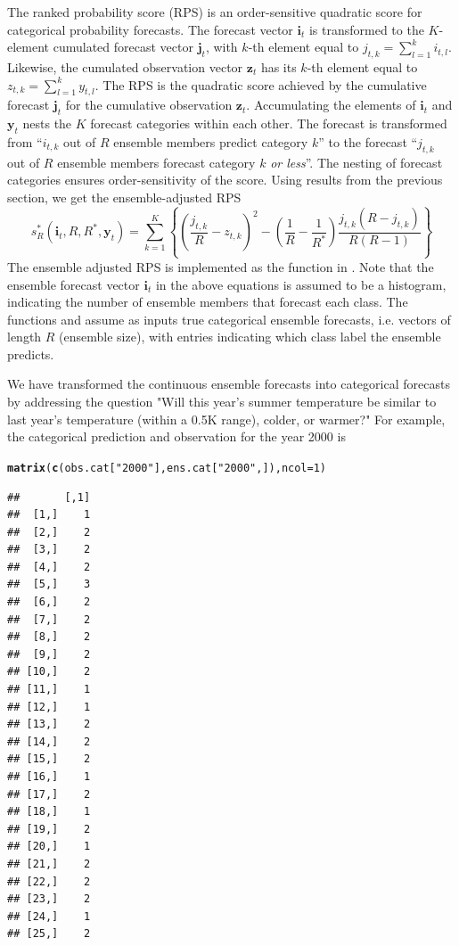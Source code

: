 \documentclass[article]{jss}\usepackage{graphicx, color}
\makeatletter
\newcommand{\hlfunctioncall}[1]{\textcolor[rgb]{0,0.501960784313725,0.752941176470588}{\textbf{#1}}}%
\newcommand{\hlstring}[1]{\textcolor[rgb]{0.650980392156863,0.52156862745098,0}{#1}}%
\newenvironment{kframe}{%
 \def\at@end@of@kframe{}%
 \ifinner\ifhmode%
  \def\at@end@of@kframe{\end{minipage}}%
  \begin{minipage}{\columnwidth}%
 \fi\fi%
 \def\FrameCommand##1{\hskip\@totalleftmargin \hskip-\fboxsep
 \colorbox{shadecolor}{##1}\hskip-\fboxsep
     \hskip-\linewidth \hskip-\@totalleftmargin \hskip\columnwidth}%
 \MakeFramed {\advance\hsize-\width
   \@totalleftmargin\z@ \linewidth\hsize
   \@setminipage}}%
 {\par\unskip\endMakeFramed%
 \at@end@of@kframe}
\newenvironment{knitrout}{}{} %
\makeatother
\begin{document}
The ranked probability score (RPS) is an order-sensitive quadratic score for categorical probability forecasts.
The forecast vector $\mathbf{i}_t$ is transformed to the $K$-element cumulated forecast vector $\mathbf{j}_t$, with $k$-th element equal to $j_{t,k} = \sum_{l=1}^k i_{t,l}$.
Likewise, the cumulated observation vector $\mathbf{z}_t$ has its $k$-th element equal to $z_{t,k} = \sum_{l=1}^k y_{t,l}$.
The RPS is the quadratic score achieved by the cumulative forecast $\mathbf{j}_t$ for the cumulative observation $\mathbf{z}_t$.
Accumulating the elements of $\mathbf{i}_t$ and $\mathbf{y}_t$ nests the $K$ forecast categories within each other. 
The forecast is transformed from ``$i_{t,k}$ out of $R$ ensemble members predict category $k$'' to the forecast ``$j_{t,k}$ out of $R$ ensemble members forecast category $k$ \emph{or less}''.
The nesting of forecast categories ensures order-sensitivity of the score.
Using results from the previous section, we get the ensemble-adjusted RPS
%
\begin{equation}
s_{R}^*(\mathbf{i}_t, R, R^*, \mathbf{y}_t) = \sum_{k=1}^K \left\{ \left(\frac{j_{t,k}}{R} - z_{t,k}\right)^2 - \left(\frac{1}{R} - \frac{1}{R^*}\right) \frac{j_{t,k}(R-j_{t,k})}{R(R-1)}\right\}
\end{equation}
%
The ensemble adjusted RPS is implemented as the function  in .
Note that the ensemble forecast vector $\mathbf{i}_t$ in the above equations is assumed to be a histogram, indicating the number of ensemble members that forecast each class. 
The functions  and  assume as inputs true categorical ensemble forecasts, i.e. vectors of length $R$ (ensemble size), with entries indicating which class label the ensemble predicts.



We have transformed the continuous ensemble forecasts into categorical forecasts by addressing the question "Will this year's summer temperature be similar to last year's temperature (within a 0.5K range), colder, or warmer?"
For example, the categorical prediction and observation for the year 2000 is

\begin{knitrout}
\color{fgcolor}\begin{kframe}
\begin{alltt}
\hlfunctioncall{matrix}(\hlfunctioncall{c}(obs.cat[\hlstring{"2000"}], ens.cat[\hlstring{"2000"},]), ncol=1)
\end{alltt}
\begin{verbatim}
##       [,1]
##  [1,]    1
##  [2,]    2
##  [3,]    2
##  [4,]    2
##  [5,]    3
##  [6,]    2
##  [7,]    2
##  [8,]    2
##  [9,]    2
## [10,]    2
## [11,]    1
## [12,]    1
## [13,]    2
## [14,]    2
## [15,]    2
## [16,]    1
## [17,]    2
## [18,]    1
## [19,]    2
## [20,]    1
## [21,]    2
## [22,]    2
## [23,]    2
## [24,]    1
## [25,]    2
\end{verbatim}
\end{kframe}
\end{knitrout}
\end{document}
